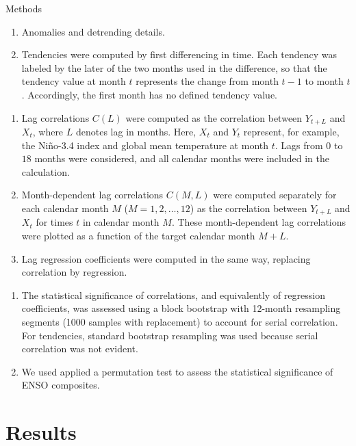 \documentclass[aspectratio=169,xcolor=dvipsnames]{beamer}
\begin{document}
\begin{frame}{Methods}
  \begin{enumerate}\scriptsize
  \item Anomalies and detrending details. 

  \item Tendencies were computed by first differencing in time. Each
    tendency was labeled by the later of the two months used in the
    difference, so that the tendency value at month $t$ represents the
    change from month $t-1$ to month $t$. Accordingly, the first month
    has no defined tendency value.
  \end{enumerate}
  \begin{enumerate}    
  \item Lag correlations $C(L)$ were computed as the correlation
    between $Y_{t+L}$ and $X_t$, where $L$ denotes lag in
    months. Here, $X_t$ and $Y_t$ represent, for example, the Niño-3.4
    index and global mean temperature at month $t$. Lags from $0$ to
    $18$ months were considered, and all calendar months were included
    in the calculation.

  \item Month-dependent lag correlations $C(M,L)$ were computed
    separately for each calendar month $M$ ($M=1,2,\ldots,12$) as the
    correlation between $Y_{t+L}$ and $X_t$ for times $t$ in calendar
    month $M$. These month-dependent lag correlations were plotted as
    a function of the target calendar month $M+L$.

  \item Lag regression coefficients were computed in the same way,
    replacing correlation by regression.
  \end{enumerate}
  \begin{enumerate}    
  \item The statistical significance of correlations, and equivalently
    of regression coefficients, was assessed using a block bootstrap
    with 12-month resampling segments (1000 samples with replacement)
    to account for serial correlation. For tendencies, standard
    bootstrap resampling was used because serial correlation was not
    evident.
  \item We used applied a permutation test to assess the statistical
    significance of ENSO composites.
  \end{enumerate}
\end{frame}

\section{Results}
\end{document}
